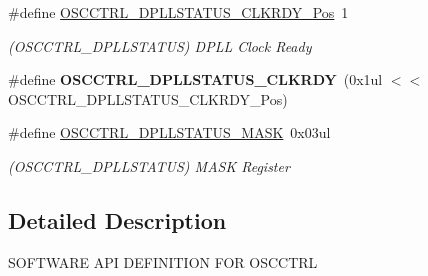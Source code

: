 \begin{DoxyCompactItemize}
\item 
\hypertarget{group___s_a_m_l21___o_s_c_c_t_r_l_ga7050091daa0c7060570b8fb41a4396c7}{}\#define \hyperlink{group___s_a_m_l21___o_s_c_c_t_r_l_ga7050091daa0c7060570b8fb41a4396c7}{O\+S\+C\+C\+T\+R\+L\+\_\+\+D\+P\+L\+L\+S\+T\+A\+T\+U\+S\+\_\+\+C\+L\+K\+R\+D\+Y\+\_\+\+Pos}~1\label{group___s_a_m_l21___o_s_c_c_t_r_l_ga7050091daa0c7060570b8fb41a4396c7}

\begin{DoxyCompactList}\small\item\em (O\+S\+C\+C\+T\+R\+L\+\_\+\+D\+P\+L\+L\+S\+T\+A\+T\+U\+S) D\+P\+L\+L Clock Ready \end{DoxyCompactList}\item 
\hypertarget{group___s_a_m_l21___o_s_c_c_t_r_l_ga9ee9a566fff7640fed7286102547bbb4}{}\#define {\bfseries O\+S\+C\+C\+T\+R\+L\+\_\+\+D\+P\+L\+L\+S\+T\+A\+T\+U\+S\+\_\+\+C\+L\+K\+R\+D\+Y}~(0x1ul $<$$<$ O\+S\+C\+C\+T\+R\+L\+\_\+\+D\+P\+L\+L\+S\+T\+A\+T\+U\+S\+\_\+\+C\+L\+K\+R\+D\+Y\+\_\+\+Pos)\label{group___s_a_m_l21___o_s_c_c_t_r_l_ga9ee9a566fff7640fed7286102547bbb4}

\item 
\hypertarget{group___s_a_m_l21___o_s_c_c_t_r_l_ga9594a8635037d6f6303db8bb1f9abede}{}\#define \hyperlink{group___s_a_m_l21___o_s_c_c_t_r_l_ga9594a8635037d6f6303db8bb1f9abede}{O\+S\+C\+C\+T\+R\+L\+\_\+\+D\+P\+L\+L\+S\+T\+A\+T\+U\+S\+\_\+\+M\+A\+S\+K}~0x03ul\label{group___s_a_m_l21___o_s_c_c_t_r_l_ga9594a8635037d6f6303db8bb1f9abede}

\begin{DoxyCompactList}\small\item\em (O\+S\+C\+C\+T\+R\+L\+\_\+\+D\+P\+L\+L\+S\+T\+A\+T\+U\+S) M\+A\+S\+K Register \end{DoxyCompactList}\end{DoxyCompactItemize}


\subsection{Detailed Description}
S\+O\+F\+T\+W\+A\+R\+E A\+P\+I D\+E\+F\+I\+N\+I\+T\+I\+O\+N F\+O\+R O\+S\+C\+C\+T\+R\+L 